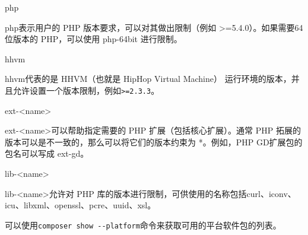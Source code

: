 \begin{compactitem}
\item php

php表示用户的 PHP 版本要求，可以对其做出限制（例如 >=5.4.0）。如果需要64位版本的 PHP，可以使用 php-64bit 进行限制。

\item hhvm

hhvm代表的是 HHVM（也就是 HipHop Virtual Machine） 运行环境的版本，并且允许设置一个版本限制，例如\texttt{>=2.3.3}。

\item ext-<name>

ext-<name>可以帮助指定需要的 PHP 扩展（包括核心扩展）。通常 PHP 拓展的版本可以是不一致的，那么可以将它们的版本约束为 *。例如，PHP GD扩展包的包名可以写成 ext-gd。

\item lib-<name>

lib-<name>允许对 PHP 库的版本进行限制，可供使用的名称包括curl、iconv、icu、libxml、openssl、pcre、uuid、xsl。
\end{compactitem}

可以使用\texttt{composer show -\/-platform}命令来获取可用的平台软件包的列表。


